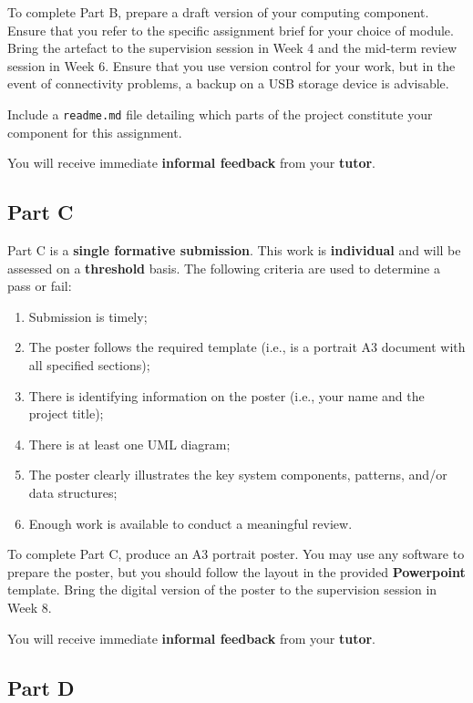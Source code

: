 \documentclass{../../fal_assignment}
\begin{document}
To complete Part B, prepare a draft version of your computing component. Ensure that you refer to the specific assignment brief for your choice of module.
Bring the artefact to the supervision session in Week 4 and the mid-term review session in Week 6. Ensure that you use version control for your work, but in the event of connectivity problems, a backup on a USB storage device is advisable.

Include a \texttt{readme.md} file detailing which parts of the project constitute your component for this assignment.

You will receive immediate \textbf{informal feedback} from your \textbf{tutor}.

\subsection*{Part C}

Part C is a \textbf{single formative submission}. This work is \textbf{individual} and will be assessed on a \textbf{threshold} basis.  The following criteria are used to determine a pass or fail:

\begin{enumerate}[label=(\alph*)]
	\item Submission is timely;
	\item The poster follows the required template  (i.e., is a portrait A3 document with all specified sections);
	\item There is identifying information on the poster (i.e., your name and the project title);
	\item There is at least one UML diagram;
	\item The poster clearly illustrates the key system components, patterns, and/or data structures;
	\item Enough work is available to conduct a meaningful review.
\end{enumerate}

To complete Part C, produce an A3 portrait poster. You may use any software to prepare the poster, but you should follow the layout in the provided \textbf{Powerpoint} template.  Bring the digital version of the poster to the supervision session in Week 8.

You will receive immediate \textbf{informal feedback} from your \textbf{tutor}.

\subsection*{Part D}
\end{document}
